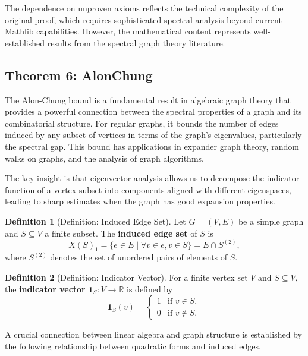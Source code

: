 \documentclass[11pt]{article}
\theoremstyle{plain}
\theoremstyle{definition}
\newtheorem*{definition}{Definition}
\theoremstyle{remark}
\begin{document}
The dependence on unproven axioms reflects the technical complexity of the original proof, which requires sophisticated spectral analysis beyond current Mathlib capabilities. However, the mathematical content represents well-established results from the spectral graph theory literature.

\vspace{1em}

\subsection{Theorem 6: AlonChung}

The Alon-Chung bound is a fundamental result in algebraic graph theory that provides a powerful connection between the spectral properties of a graph and its combinatorial structure. For regular graphs, it bounds the number of edges induced by any subset of vertices in terms of the graph's eigenvalues, particularly the spectral gap. This bound has applications in expander graph theory, random walks on graphs, and the analysis of graph algorithms.

The key insight is that eigenvector analysis allows us to decompose the indicator function of a vertex subset into components aligned with different eigenspaces, leading to sharp estimates when the graph has good expansion properties.

\begin{definition}[Definition: Induced Edge Set]
Let $G = (V, E)$ be a simple graph and $S \subseteq V$ a finite subset. The \textbf{induced edge set} of $S$ is
\[
X(S)_1 = \{ e \in E \mid \forall v \in e, v \in S \} = E \cap S^{(2)},
\]
where $S^{(2)}$ denotes the set of unordered pairs of elements of $S$.
\end{definition}

\begin{definition}[Definition: Indicator Vector]
For a finite vertex set $V$ and $S \subseteq V$, the \textbf{indicator vector} $\mathbf{1}_S : V \to \mathbb{R}$ is defined by
\[
\mathbf{1}_S(v) = \begin{cases} 1 & \text{if } v \in S, \\ 0 & \text{if } v \notin S. \end{cases}
\]
\end{definition}

A crucial connection between linear algebra and graph structure is established by the following relationship between quadratic forms and induced edges.
\end{document}
